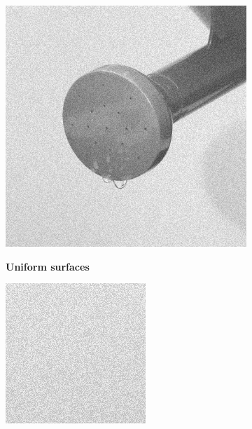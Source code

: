 \begin{figure}[H]
    \centering
    \begin{subfigure}[b]{0.24\textwidth}
        \includegraphics[width=\textwidth]{img3/rect_org_img3.png}
        \begin{center}
        	\textbf{Uniform surfaces}
        \end{center}
        \includegraphics[width=\textwidth]{img3/rect_src_img3.png}\\[0.1cm]

\end{subfigure}
\end{figure}
